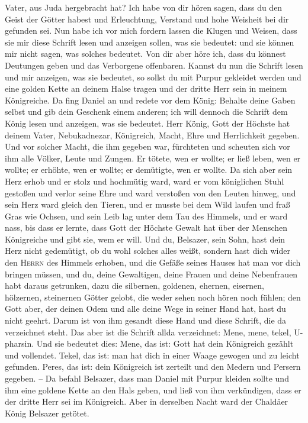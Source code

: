 Vater, aus Juda hergebracht hat?  Ich habe von dir hören
sagen, dass du den Geist der Götter habest und Erleuchtung, Verstand und
hohe Weisheit bei dir gefunden sei.  Nun habe ich vor
mich fordern lassen die Klugen und Weisen, dass sie mir diese Schrift
lesen und anzeigen sollen, was sie bedeutet: und sie können mir nicht
sagen, was solches bedeutet.  Von dir aber höre ich, dass
du könnest Deutungen geben und das Verborgene offenbaren. Kannst du nun
die Schrift lesen und mir anzeigen, was sie bedeutet, so sollst du mit
Purpur gekleidet werden und eine golden Kette an deinem Halse tragen und
der dritte Herr sein in meinem Königreiche.  Da fing
Daniel an und redete vor dem König: Behalte deine Gaben selbst und gib
dein Geschenk einem anderen; ich will dennoch die Schrift dem König
lesen und anzeigen, was sie bedeutet.  Herr König, Gott
der Höchste hat deinem Vater, Nebukadnezar, Königreich, Macht, Ehre und
Herrlichkeit gegeben.  Und vor solcher Macht, die ihm
gegeben war, fürchteten und scheuten sich vor ihm alle Völker, Leute und
Zungen. Er tötete, wen er wollte; er ließ leben, wen er wollte; er
erhöhte, wen er wollte; er demütigte, wen er wollte.  Da
sich aber sein Herz erhob und er stolz und hochmütig ward, ward er vom
königlichen Stuhl gestoßen und verlor seine Ehre  und
ward verstoßen von den Leuten hinweg, und sein Herz ward gleich den
Tieren, und er musste bei dem Wild laufen und fraß Gras wie Ochsen, und
sein Leib lag unter dem Tau des Himmels, und er ward nass, bis dass er
lernte, dass Gott der Höchste Gewalt hat über der Menschen Königreiche
und gibt sie, wem er will.  Und du, Belsazer, sein Sohn,
hast dein Herz nicht gedemütigt, ob du wohl solches alles weißt,
 sondern hast dich wider den \textsc{Herrn} des Himmels
erhoben, und die Gefäße seines Hauses hat man vor dich bringen müssen,
und du, deine Gewaltigen, deine Frauen und deine Nebenfrauen habt daraus
getrunken, dazu die silbernen, goldenen, ehernen, eisernen, hölzernen,
steinernen Götter gelobt, die weder sehen noch hören noch fühlen; den
Gott aber, der deinen Odem und alle deine Wege in seiner Hand hat, hast
du nicht geehrt.  Darum ist von ihm gesandt diese Hand
und diese Schrift, die da verzeichnet steht.  Das aber
ist die Schrift allda verzeichnet: Mene, mene, tekel, U-pharsin.
 Und sie bedeutet dies: Mene, das ist: Gott hat dein
Königreich gezählt und vollendet.  Tekel, das ist: man
hat dich in einer Waage gewogen und zu leicht gefunden. 
Peres, das ist: dein Königreich ist zerteilt und den Medern und Persern
gegeben. --  Da befahl Belsazer, dass man Daniel mit
Purpur kleiden sollte und ihm eine goldene Kette an den Hals geben, und
ließ von ihm verkündigen, dass er der dritte Herr sei im Königreich.
 Aber in derselben Nacht ward der Chaldäer König Belsazer
getötet.

